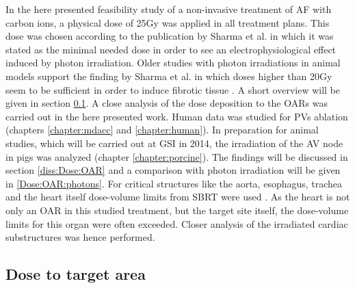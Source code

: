 In the here presented feasibility study of a non-invasive treatment of AF with carbon ions, a physical dose of 25Gy was 
applied in all treatment plans. This dose was chosen according to the publication by Sharma et al. \cite{Sha10}  
in which it was stated as the minimal needed dose in order to see an electrophysiological effect induced by photon irradiation. 
Older studies with photon irradiations in animal models support the finding by Sharma et al. in which doses higher than 20Gy seem 
to be sufficient in order to induce fibrotic tissue \cite{Faj70, Faj73}. A short overview will be given in section \ref{Dose:Target}.\newline
\newline
A close analysis of the dose deposition to the OARs was carried out in the here presented work. Human data was studied for PVs ablation 
(chapters \ref{chapter:mdacc} and \ref{chapter:human}). In preparation for animal studies, which will be carried out at GSI in 2014, the 
irradiation of the AV node in pigs was analyzed (chapter \ref{chapter:porcine}). The findings will be discussed in section \ref{diss:Dose:OAR} 
and a comparison with photon irradiation will be given in \ref{Dose:OAR:photons}. For critical structures like the aorta, esophagus, trachea 
and the heart itself dose-volume limits from SBRT were used \cite{RTOG0631, RTOG0915}. As the heart is not only an OAR in this studied 
treatment, but the target site itself, the dose-volume limits for this organ were often exceeded. Closer analysis of the irradiated cardiac 
substructures was hence performed.  



\subsection{Dose to target area}
\label{Dose:Target}

